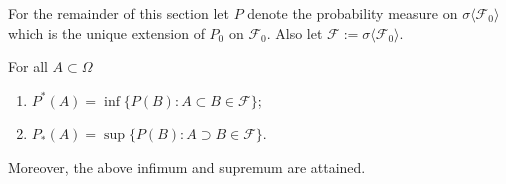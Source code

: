 \begin{sectionassumption}
\label{outer2}
For the remainder of this section let $P$ denote the probability measure  on $\sigma\langle \mathcal F_0\rangle$ which is the unique extension of  $P_0$ on $\mathcal F_0$. Also let $\mathcal F:=\sigma\langle \mathcal F_0\rangle$.
\end{sectionassumption}

\begin{theorem}
\label{thm: Easier formula for $P^*$}
For all $A\subset\Omega$
\begin{enumerate}
\item\label{item1: Easier formula for $P^*$} $P^*(A)=\inf\{ P(B): A\subset B\in   \mathcal F \}$;
\item\label{item2: Easier formula for $P^*$} $P_*(A)=\sup\{ P(B): A\supset B\in  \mathcal F \}$.
\end{enumerate}
Moreover, the above infimum and supremum are attained.
\end{theorem}
